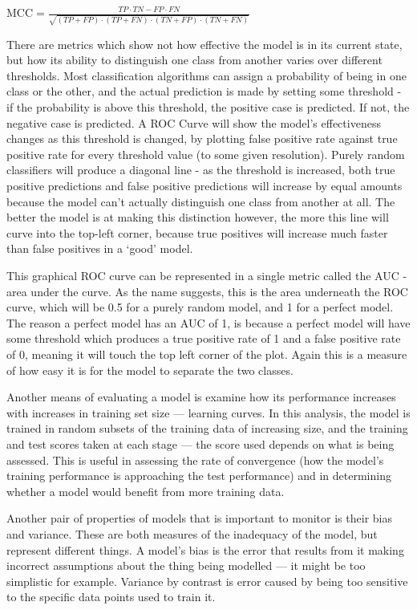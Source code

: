 $\mbox{MCC} = \frac{TP \cdot TN - FP \cdot FN}{\sqrt{(TP + FP) \cdot (TP + FN) \cdot (TN + FP) \cdot (TN + FN)}}$

There are metrics which show not how effective the model is in its current state, but how its ability to distinguish one class from another varies over different thresholds. Most classification algorithms can assign a probability of being in one class or the other, and the actual prediction is made by setting some threshold - if the probability is above this threshold, the positive case is predicted. If not, the negative case is predicted. A ROC Curve will show the model's effectiveness changes as this threshold is changed, by plotting false positive rate against true positive rate for every threshold value (to some given resolution). Purely random classifiers will produce a diagonal line - as the threshold is increased, both true positive predictions and false positive predictions will increase by equal amounts because the model can't actually distinguish one class from another at all. The better the model is at making this distinction however, the more this line will curve into the top-left corner, because true positives will increase much faster than false positives in a `good' model.

This graphical ROC curve can be represented in a single metric called the AUC - area under the curve. As the name suggests, this is the area underneath the ROC curve, which will be 0.5 for a purely random model, and 1 for a perfect model. The reason a perfect model has an AUC of 1, is because a perfect model will have some threshold which produces a true positive rate of 1 and a false positive rate of 0, meaning it will touch the top left corner of the plot. Again this is a measure of how easy it is for the model to separate the two classes.

Another means of evaluating a model is examine how its performance increases with increases in training set size --- learning curves. In this analysis, the model is trained in random subsets of the training data of increasing size, and the training and test scores taken at each stage --- the score used depends on what is being assessed. This is useful in assessing the rate of convergence (how the model's training performance is approaching the test performance) and in determining whether a model would benefit from more training data.

Another pair of properties of models that is important to monitor is their bias and variance. These are both measures of the inadequacy of the model, but represent different things. A model's bias is the error that results from it making incorrect assumptions about the thing being modelled --- it might be too simplistic for example. Variance by contrast is error caused by being too sensitive to the specific data points used to train it.

